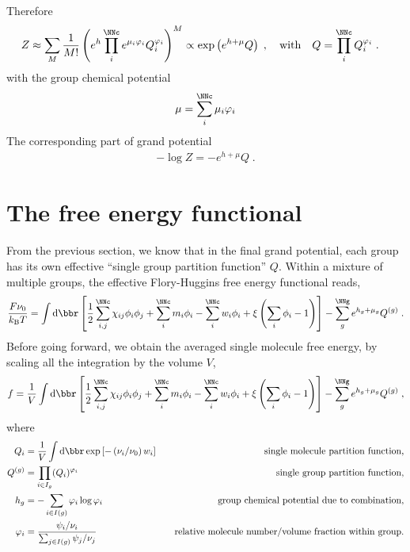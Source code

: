 \documentclass[aps,prl,reprint,onecolumn,groupedaddress,amsmath,amssymb]{revtex4-2}
\newcommand{\dd}{{\mathrm{d}}}
\newcommand{\kBT}{{k_{\mathrm{B}}T}}
\begin{document}
Therefore
\begin{align}
    Z & \approx \sum_{M} \frac{1}{M!} \left( e^{h} \prod_i^{\NNc} e^{\mu_i \varphi_i} Q_i^{\varphi_i} \right)^M \propto \exp \left( e^{h + \mu} Q \right)\;, \quad \mathrm{with} \quad Q = \prod_i^{\NNc} Q_i^{\varphi_i} \;.
\end{align}
with the group chemical potential
\begin{align}
    \mu = \sum_i^{\NNc} \mu_i \varphi_i
\end{align}
The corresponding part of grand potential
\begin{align}
    - \log Z = - e^{h + \mu}  Q \;.
\end{align}

\section{The free energy functional}
From the previous section, we know that in the final grand potential, each group has its own effective ``single group partition function'' $Q$.
Within a mixture of multiple groups, the effective Flory-Huggins free energy functional reads,
\begin{align}
    \frac{F \nu_0}{\kBT} = \int \dd \bbr \left[\frac{1}{2} \sum_{i,j}^{\NNc} \chi_{ij} \phi_i \phi_j + \sum_i^{\NNc}m_i \phi_i - \sum_i^{\NNc}w_i \phi_i + \xi \left(\sum_i \phi_i -1 \right) \right] - \sum_g^{\NNg} e^{h_g + \mu_g} Q^{(g)} \;.
\end{align}
Before going forward, we obtain the averaged single molecule free energy, by scaling all the integration by the volume $V$,
\begin{align}
    f = \frac{1}{V}\int \dd \bbr \left[\frac{1}{2} \sum_{i,j}^{\NNc} \chi_{ij} \phi_i \phi_j + \sum_i^{\NNc}m_i \phi_i - \sum_i^{\NNc}w_i \phi_i + \xi \left(\sum_i \phi_i -1 \right) \right] - \sum_g^{\NNg} e^{h_g + \mu_g} Q^{(g)} \;,
\end{align}
where
\begin{subequations}
    \begin{align}
        Q_i       & = \frac{1}{V}\int \dd \bbr \exp\left[-\left(\nu_i/\nu_0\right) w_i\right]  \quad & \text{single molecule partition function,}                    \\
        Q^{(g)}   & = \prod_{i \in I_g} (Q_i)^{\varphi_i} \quad                                      & \text{single group partition function,}                       \\
        h_g       & = - \sum_{i \in I(g)} \varphi_i \log \varphi_i              \quad                & \text{group chemical potential due to combination,}           \\
        \varphi_i & = \frac{\psi_i / \nu_i}{\sum_{j \in I(g)} \psi_j / \nu_j}\quad                   & \text{relative molecule number/volume fraction within group.}
    \end{align}
\end{subequations}
\end{document}
